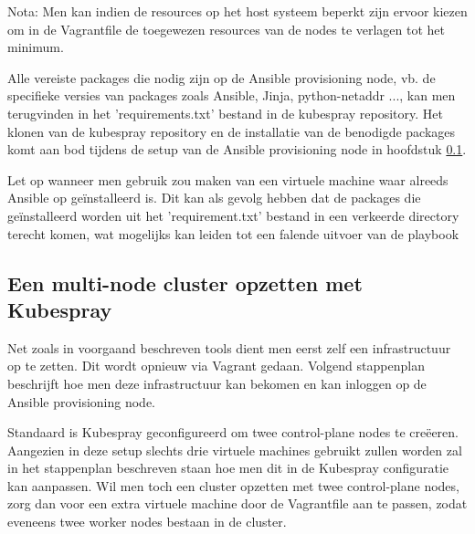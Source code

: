 Nota: Men kan indien de resources op het host systeem beperkt zijn ervoor kiezen om in de Vagrantfile de toegewezen resources van de nodes te verlagen tot het minimum. 

Alle vereiste packages die nodig zijn op de Ansible provisioning node, vb. de specifieke versies van packages zoals Ansible, Jinja, python-netaddr ..., kan men terugvinden in het 'requirements.txt' bestand in de kubespray repository. \autocite{Kubespray2022} Het klonen van de kubespray repository en de installatie van de benodigde packages komt aan bod tijdens de setup van de Ansible provisioning node in hoofdstuk \ref{sec:kubespraysetup}. 

Let op wanneer men gebruik zou maken van een virtuele machine waar alreeds Ansible op geïnstalleerd is. Dit kan als gevolg hebben dat de packages die geïnstalleerd worden uit het 'requirement.txt' bestand in een verkeerde directory terecht komen, wat mogelijks kan leiden tot een falende uitvoer van de playbook \autocite{Kubespray2022a}

\subsection{Een multi-node cluster opzetten met Kubespray}
\label{sec:kubespraysetup}
Net zoals in voorgaand beschreven tools dient men eerst zelf een infrastructuur op te zetten. Dit wordt opnieuw via Vagrant gedaan. Volgend stappenplan beschrijft hoe men deze infrastructuur kan bekomen en kan inloggen op de Ansible provisioning node. 

Standaard is Kubespray geconfigureerd om twee control-plane nodes te creëeren. Aangezien in deze setup slechts drie virtuele machines gebruikt zullen worden zal in het stappenplan beschreven staan hoe men dit in de Kubespray configuratie kan aanpassen. Wil men toch een cluster opzetten met twee control-plane nodes, zorg dan voor een extra virtuele machine door de Vagrantfile aan te passen, zodat eveneens twee worker nodes bestaan in de cluster. 


